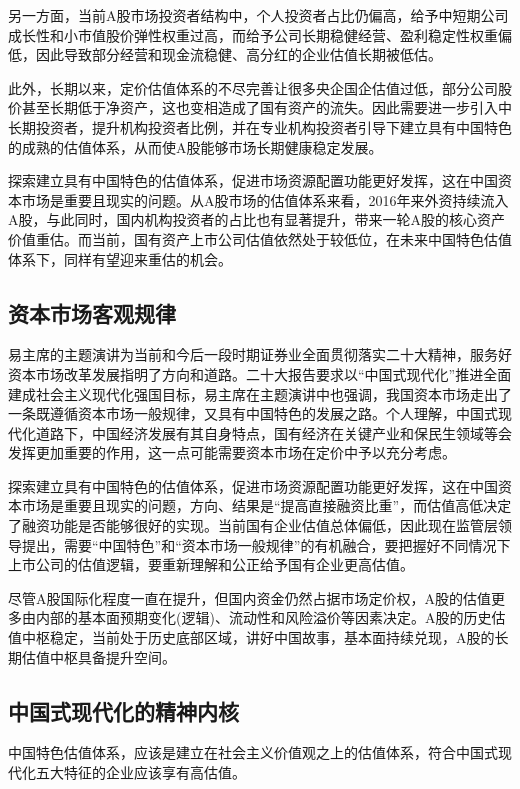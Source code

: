 \documentclass{ctexart}
\begin{document}
另一方面，当前A股市场投资者结构中，个人投资者占比仍偏高，给予中短期公司成长性和小市值股价弹性权重过高，而给予公司长期稳健经营、盈利稳定性权重偏低，因此导致部分经营和现金流稳健、高分红的企业估值长期被低估。

此外，长期以来，定价估值体系的不尽完善让很多央企国企估值过低，部分公司股价甚至长期低于净资产，这也变相造成了国有资产的流失。因此需要进一步引入中长期投资者，提升机构投资者比例，并在专业机构投资者引导下建立具有中国特色的成熟的估值体系，从而使A股能够市场长期健康稳定发展。

探索建立具有中国特色的估值体系，促进市场资源配置功能更好发挥，这在中国资本市场是重要且现实的问题。从A股市场的估值体系来看，2016年来外资持续流入A股，与此同时，国内机构投资者的占比也有显著提升，带来一轮A股的核心资产价值重估。而当前，国有资产上市公司估值依然处于较低位，在未来中国特色估值体系下，同样有望迎来重估的机会。

\subsection*{资本市场客观规律}

易主席的主题演讲为当前和今后一段时期证券业全面贯彻落实二十大精神，服务好资本市场改革发展指明了方向和道路。二十大报告要求以“中国式现代化”推进全面建成社会主义现代化强国目标，易主席在主题演讲中也强调，我国资本市场走出了一条既遵循资本市场一般规律，又具有中国特色的发展之路。个人理解，中国式现代化道路下，中国经济发展有其自身特点，国有经济在关键产业和保民生领域等会发挥更加重要的作用，这一点可能需要资本市场在定价中予以充分考虑。

探索建立具有中国特色的估值体系，促进市场资源配置功能更好发挥，这在中国资本市场是重要且现实的问题，方向、结果是“提高直接融资比重”，而估值高低决定了融资功能是否能够很好的实现。当前国有企业估值总体偏低，因此现在监管层领导提出，需要“中国特色”和“资本市场一般规律”的有机融合，要把握好不同情况下上市公司的估值逻辑，要重新理解和公正给予国有企业更高估值。

尽管A股国际化程度一直在提升，但国内资金仍然占据市场定价权，A股的估值更多由内部的基本面预期变化(逻辑)、流动性和风险溢价等因素决定。A股的历史估值中枢稳定，当前处于历史底部区域，讲好中国故事，基本面持续兑现，A股的长期估值中枢具备提升空间。


\subsection*{中国式现代化的精神内核}
中国特色估值体系，应该是建立在社会主义价值观之上的估值体系，符合中国式现代化五大特征的企业应该享有高估值。
\end{document}
